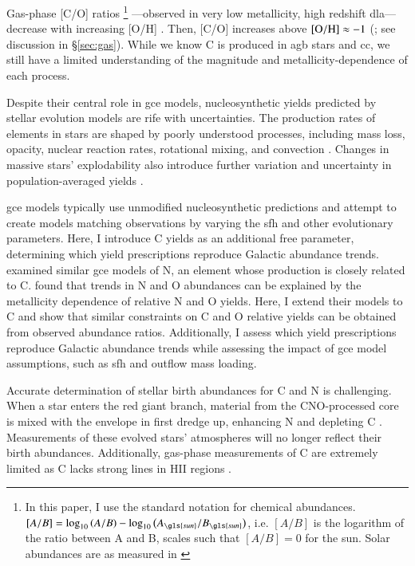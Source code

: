 \documentclass[12pt,oneside,letterpaper]{report}
\newcommand{\cc}{\gls{cc}}
\newcommand{\agb}{\gls{agb}}
\newcommand{\sfh}{\gls{sfh}}
\newcommand{\dla}{\gls{dla}}
\newcommand{\gce}{\gls{gce}}
\newcommand{\Gce}{\Gls{gce}}
\newcommand{\sun}{\gls{sun}}
\begin{document}
Gas-phase [C/O] ratios%
%
\footnote{In this paper, I use the standard notation for chemical abundances. $[A/B] = \log_{10}\left(A/B\right) - \log_{10}\left(A_{\sun}/B_{\sun}\right)$, i.e. $[A/B]$ is the logarithm of the ratio between A and B, scales such that $[A/B]=0$ for the sun. Solar abundances are as measured in \citet{asplund+09}}%
%
---observed in very low \gls{metallicity}, high redshift \dla---decrease with increasing [O/H] \citep{FN15, cooke+17}. Then, [C/O] increases above $\rm [O/H] \approx -1$ (\citealt{berg+19}; see discussion in \S\ref{sec:gas}).
While we know C is produced in \agb{} stars and \cc{}, we still have a limited understanding of the magnitude and metallicity-dependence of each process.


Despite their central role in \gce{} models, nucleosynthetic yields predicted by stellar evolution models are rife with uncertainties. The production rates of elements in stars are shaped by poorly understood processes, including mass loss, opacity, nuclear reaction rates, rotational mixing, and convection \citep{KL14,ventura+13, LC18}.
Changes in massive stars' explodability also introduce further variation and uncertainty in population-averaged yields \citep{emily+21}.

\Gce{} models typically use unmodified nucleosynthetic predictions and attempt to create models matching observations by varying the \sfh{} and other evolutionary parameters. Here, I introduce C yields as an additional free parameter, determining which yield prescriptions reproduce Galactic abundance trends.
\cite{james+23} examined similar \gce{} models of N, an element whose production is closely related to C. \cite{james+23} found that trends in N and O abundances can be explained by the metallicity dependence of relative N and O yields. Here, I extend their models to C and show that similar constraints on C and O relative yields can be obtained from observed abundance ratios. Additionally, I assess which yield prescriptions reproduce Galactic abundance trends while assessing the impact of \gce{} model assumptions, such as \sfh{} and outflow mass loading.

Accurate determination of stellar birth abundances for C and N is challenging. When a star enters the red giant branch, material from the CNO-processed core is mixed with the envelope in first dredge up, enhancing N and depleting C \citep{iben67, vincenzo+21,KL14}. Measurements of these evolved stars'  atmospheres will no longer reflect their birth abundances.  Additionally, gas-phase measurements of C are extremely limited as C lacks strong lines in HII regions \citep{skillman+20}.
\end{document}
